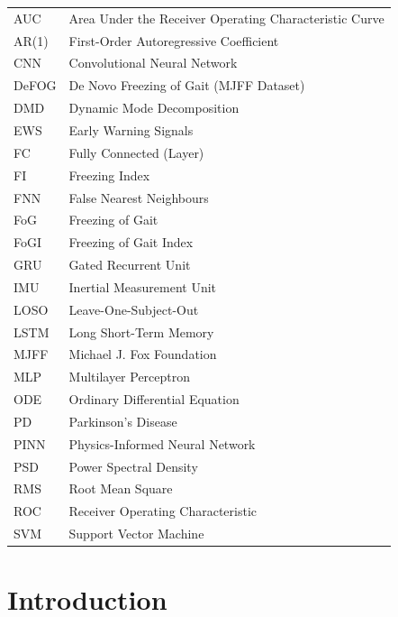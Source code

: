 \documentclass[12pt,a4paper,oneside]{report}
\numberwithin{equation}{chapter}
\numberwithin{figure}{chapter}
\numberwithin{table}{chapter}
\begin{document}
\begin{longtable}{@{}p{4cm}p{10cm}@{}}
AUC    & Area Under the Receiver Operating Characteristic Curve \\
AR(1)  & First-Order Autoregressive Coefficient \\
CNN    & Convolutional Neural Network \\
DeFOG  & De Novo Freezing of Gait (MJFF Dataset) \\
DMD    & Dynamic Mode Decomposition \\
EWS    & Early Warning Signals \\
FC     & Fully Connected (Layer) \\
FI     & Freezing Index \\
FNN    & False Nearest Neighbours \\
FoG    & Freezing of Gait \\
FoGI   & Freezing of Gait Index \\
GRU    & Gated Recurrent Unit \\
IMU    & Inertial Measurement Unit \\
LOSO   & Leave-One-Subject-Out \\
LSTM   & Long Short-Term Memory \\
MJFF   & Michael J. Fox Foundation \\
MLP    & Multilayer Perceptron \\
ODE    & Ordinary Differential Equation \\
PD     & Parkinson's Disease \\
PINN   & Physics-Informed Neural Network \\
PSD    & Power Spectral Density \\
RMS    & Root Mean Square \\
ROC    & Receiver Operating Characteristic \\
SVM    & Support Vector Machine \\
\end{longtable}

\newpage


\newpage
{}


\chapter{Introduction}
\end{document}
